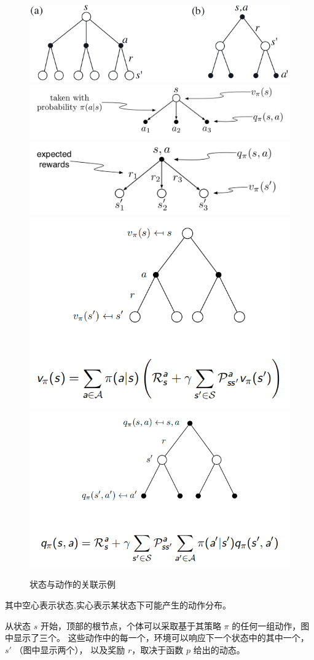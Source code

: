 \documentclass[UTF8,a4paper,12pt]{ctexbook}
\begin{document}
				\begin{figure}[H]
					\centering
					\includegraphics[width=.7\linewidth]{qV}
					\includegraphics[width=.8\linewidth]{qV01}
					\includegraphics[width=.8\linewidth]{qV02}
					\includegraphics[width=.6\linewidth]{qV03}
					\includegraphics[width=.6\linewidth]{qV04}
					\caption{状态与动作的关联示例}
					\label{q(a,s)}
				\end{figure}
				
				其中空心表示状态,实心表示某状态下可能产生的动作分布。
				
				从状态 $s$ 开始，顶部的根节点，个体可以采取基于其策略 $\pi$ 的任何一组动作，图中显示了三个。 这些动作中的每一个，环境可以响应下一个状态中的其中一个，$s′$ （图中显示两个）， 以及奖励 $r$，取决于函数 $p$ 给出的动态。
				
\end{document}
